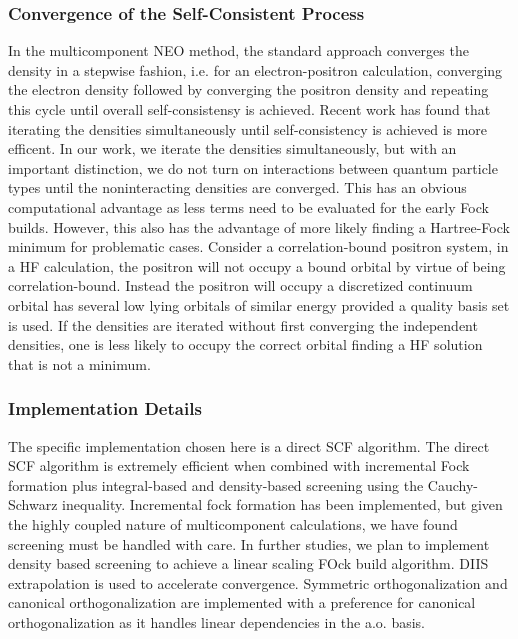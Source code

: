 \subsubsection{Convergence of the Self-Consistent Process}
In the multicomponent NEO method, the standard approach converges the density in a stepwise fashion, i.e. for an electron-positron calculation, converging the electron density followed by converging the positron density and repeating this cycle until overall self-consistensy is achieved.
Recent work has found that iterating the densities simultaneously until self-consistency is achieved is more efficent.
In our work, we iterate the densities simultaneously, but with an important distinction, we do not turn on interactions between quantum particle types until the noninteracting densities are converged.
This has an obvious computational advantage as less terms need to be evaluated for the early Fock builds.
However, this also has the advantage of more likely finding a Hartree-Fock minimum for problematic cases.
Consider a correlation-bound positron system, in a HF calculation, the positron will not occupy a bound orbital by virtue of being correlation-bound.
Instead the positron will occupy a discretized continuum orbital has several low lying orbitals of similar energy provided a quality basis set is used.
If the densities are iterated without first converging the independent densities, one is less likely to occupy the correct orbital finding a HF solution that is not a minimum.

\subsubsection{Implementation Details}
The specific implementation chosen here is a direct SCF algorithm.
The direct SCF algorithm is extremely efficient when combined with incremental Fock formation plus integral-based and density-based screening using the Cauchy-Schwarz inequality.
Incremental fock formation has been implemented, but given the highly coupled nature of multicomponent calculations, we have found screening must be handled with care.
In further studies, we plan to implement density based screening to achieve a linear scaling FOck build algorithm.
DIIS extrapolation is used to accelerate convergence.
Symmetric orthogonalization and canonical orthogonalization are implemented with a preference for canonical orthogonalization as it handles linear dependencies in the a.o. basis.


